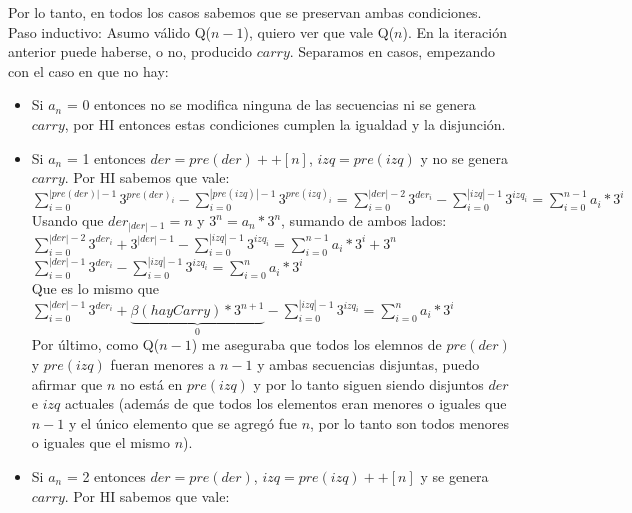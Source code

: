 	Por lo tanto, en todos los casos sabemos que se preservan ambas condiciones.
	\\

	Paso inductivo:
	Asumo válido Q($n-1$), quiero ver que vale Q($n$).
	En la iteración anterior puede haberse, o no, producido $carry$. Separamos en casos, empezando con el caso en que no hay:

	\begin{itemize}
	\item Si $a_n$ = 0 entonces no se modifica ninguna de las secuencias ni se genera $carry$, por HI entonces estas condiciones cumplen la igualdad y la disjunción.
	\item Si $a_n$ = 1 entonces $der = pre(der)++[n] $, $izq = pre(izq)$ y no se genera $carry$. Por HI sabemos que vale:
	\\

	$\sum_{i=0}^{|pre(der)|-1} 3^{pre(der)_i} - \sum_{i=0}^{|pre(izq)|-1} 3^{pre(izq)_i} = \sum_{i=0}^{|der|-2} 3^{der_i} - \sum_{i=0}^{|izq|-1} 3^{izq_i} = \sum_{i=0}^{n-1} a_i*3^{i} $
	\\

	Usando que $der_{|der|-1} = n$ y $ 3^{n} = a_{n}*3^{n}$, sumando de ambos lados:
	\\

	$\sum_{i=0}^{|der|-2} 3^{der_i} + 3^{|der|-1} - \sum_{i=0}^{|izq|-1} 3^{izq_i} = \sum_{i=0}^{n-1} a_i*3^{i} + 3^{n} $
	\\

	$\sum_{i=0}^{|der|-1} 3^{der_i} - \sum_{i=0}^{|izq|-1} 3^{izq_i} = \sum_{i=0}^{n} a_i*3^{i}$
	\\

	Que es lo mismo que $\sum_{i=0}^{|der|-1} 3^{der_i} + \underbrace{\beta(hayCarry)*3^{n+1}}_\text{0} - \sum_{i=0}^{|izq|-1} 3^{izq_i} = \sum_{i=0}^{n} a_i*3^{i} $
	\\

	Por último, como Q($n-1$) me aseguraba que todos los elemnos de $pre(der)$ y $pre(izq)$ fueran menores a $n-1$ y ambas secuencias disjuntas, puedo afirmar que $n$ no está en $pre(izq)$ y por lo tanto siguen siendo disjuntos $der$ e $izq$ actuales (además de que todos los elementos eran menores o iguales que $n-1$ y el único elemento que se agregó fue $n$, por lo tanto son todos menores o iguales que el mismo $n$).

	\item Si $a_n$ = 2 entonces $der = pre(der)$, $izq = pre(izq)++[n]$ y se genera $carry$. Por HI sabemos que vale:
	\\


\end{itemize}

